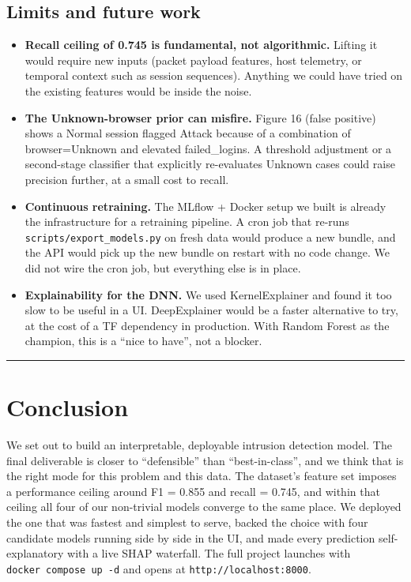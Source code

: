 \subsection{Limits and future work}\label{limits-and-future-work}

\begin{itemize}
\tightlist
\item
  \textbf{Recall ceiling of 0.745 is fundamental, not algorithmic.}
  Lifting it would require new inputs (packet payload features, host
  telemetry, or temporal context such as session sequences). Anything we
  could have tried on the existing features would be inside the noise.
\item
  \textbf{The Unknown-browser prior can misfire.} Figure 16 (false
  positive) shows a Normal session flagged Attack because of a
  combination of browser=Unknown and elevated failed\_logins. A
  threshold adjustment or a second-stage classifier that explicitly
  re-evaluates Unknown cases could raise precision further, at a small
  cost to recall.
\item
  \textbf{Continuous retraining.} The MLflow + Docker setup we built is
  already the infrastructure for a retraining pipeline. A cron job that
  re-runs \texttt{scripts/export\_models.py} on fresh data would produce
  a new bundle, and the API would pick up the new bundle on restart with
  no code change. We did not wire the cron job, but everything else is
  in place.
\item
  \textbf{Explainability for the DNN.} We used KernelExplainer and found
  it too slow to be useful in a UI. DeepExplainer would be a faster
  alternative to try, at the cost of a TF dependency in production. With
  Random Forest as the champion, this is a ``nice to have'', not a
  blocker.
\end{itemize}

\begin{center}\rule{0.5\linewidth}{0.5pt}\end{center}

\section{Conclusion}\label{conclusion}

We set out to build an interpretable, deployable intrusion detection
model. The final deliverable is closer to ``defensible'' than
``best-in-class'', and we think that is the right mode for this problem
and this data. The dataset's feature set imposes a performance ceiling
around F1 = 0.855 and recall = 0.745, and within that ceiling all four
of our non-trivial models converge to the same place. We deployed the
one that was fastest and simplest to serve, backed the choice with four
candidate models running side by side in the UI, and made every
prediction self-explanatory with a live SHAP waterfall. The full project
launches with \texttt{docker\ compose\ up\ -d} and opens at
\texttt{http://localhost:8000}.

